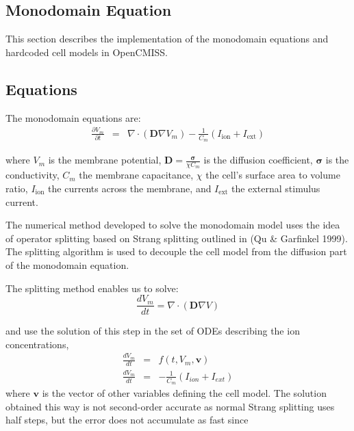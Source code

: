 
\subsection{Monodomain Equation}
 

\renewcommand{\vec}[1]{\boldsymbol{#1}}
\newcommand{\Iion}{I_{\text{ion}}}
\newcommand{\Iext}{I_{\text{ext}}}
\newcommand{\pd}[2]{\frac{\partial #1}{\partial #2}}
\newcommand{\lrbr}[1]{\left(#1\right)}
\newcommand{\dt}{\Delta t}



This section describes the implementation of the monodomain equations and hardcoded cell models in OpenCMISS.

\subsection{Equations}
The monodomain equations are:
\begin{eqnarray}
 \pd{V_m}{t}  &=&  \nabla \cdot \lrbr{\vec{D} \nabla V_m}  -  \frac{1}{C_m}\lrbr{\Iion + \Iext}
\end{eqnarray}

where $V_m$ is the membrane potential, $\vec{D}=\frac{\vec{\sigma}}{\chi C_m}$ is the diffusion coefficient, $\vec{\sigma}$ is the conductivity, $C_m$ the membrane capacitance, $\chi$ the cell's surface area to volume ratio, $\Iion$ the currents across the membrane, and $\Iext$ the external stimulus current.

The numerical method developed to solve the monodomain model uses the idea of operator splitting based on Strang splitting outlined in (Qu \& Garfinkel 1999). The splitting algorithm is used to decouple the cell model from the diffusion part of the monodomain equation. 

The splitting method enables us to solve:
\begin{equation}
\frac{d V_m}{d t} = \nabla \cdot (\mathbf{D}\nabla V)
\label{diff}
\end{equation}

and use the solution of this step in the set of ODEs describing the ion concentrations,
\begin{eqnarray}
\frac{d V_m}{d t} &=& f(t,V_m,\vec{v})\\
\frac{d V_m}{d t} &=&  - \frac{1}{C_m}(I_{ion} + I_{ext}) 
\end{eqnarray}
where $\vec{v}$ is the vector of other variables defining the cell model.
The solution obtained this way is not second-order accurate as normal Strang splitting uses half steps, but the error does not accumulate as
fast since


